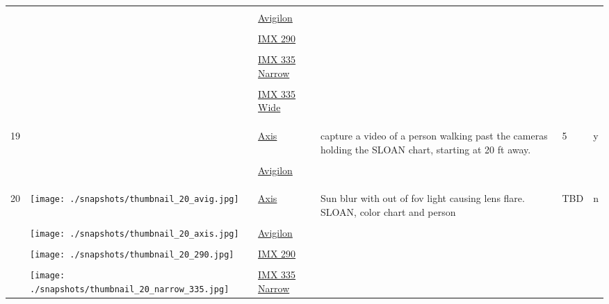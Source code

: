 \documentclass{article}%
\begin{document}
\begin{longtabu}{m{2.5cm} m{4cm} m{2cm} m{4cm} m{2cm} m{2cm}}
&&&&&\\%
&&\href{https://drive.google.com/file/d/1-qcgwIeB-aKKPN4876UKK7xUrmr5qoIq/view?usp=sharing}{Avigilon}&&&\\%
&&&&&\\%
&&\href{https://drive.google.com/file/d/1Iu1EfLJeHXa_JjDllOpr4-4cYTW-A6Qi/view?usp=sharing}{IMX 290}&&&\\%
&&&&&\\%
&&\href{https://drive.google.com/file/d/1vJurSPq0d2-cwRqFMI4j0Qtn5R3tj9Yf/view?usp=sharing}{IMX 335 Narrow}&&&\\%
&&&&&\\%
&&\href{https://drive.google.com/file/d/1WiUEC6ezI_au_0h3I4fXktTtXZvN71U1/view?usp=sharing}{IMX 335 Wide}&&&\\%
&&&&&\\%
&&&&&\\%
\hline%
&&&&&\\%
19&&\href{https://drive.google.com/file/d/1MypfVfnqdCmO7k3TIUOi_xsSDUAeejEr/view?usp=sharing}{Axis}&capture a video of a person walking past the cameras holding the SLOAN chart, starting at 20 ft away.&5&y\\%
&&&&&\\%
&&\href{https://drive.google.com/file/d/1Te8pv5D3VoVtNM7divX0yjCCQKAPuWkI/view?usp=sharing}{Avigilon}&&&\\%
&&&&&\\%
&&&&&\\%
\hline%
&&&&&\\%
20&\texttt{[image: ./snapshots/thumbnail\_20\_avig.jpg]}&\href{https://drive.google.com/file/d/1trMoN4_Qj6rcwCSOHmtkgjWLLSku7EkM/view?usp=sharing}{Axis}&Sun blur with out of fov light causing lens flare. SLOAN, color chart and person&TBD&n\\%
&&&&&\\%
&\texttt{[image: ./snapshots/thumbnail\_20\_axis.jpg]}&\href{https://drive.google.com/file/d/1vB1T6RgYJtf6zrmMJLaJG1hKovBnLq4O/view?usp=sharing}{Avigilon}&&&\\%
&&&&&\\%
&\texttt{[image: ./snapshots/thumbnail\_20\_290.jpg]}&\href{https://drive.google.com/file/d/1T-HAzKTL7PPchgBkOmDlhMyL-z_yinWA/view?usp=sharing}{IMX 290}&&&\\%
&&&&&\\%
&\texttt{[image: ./snapshots/thumbnail\_20\_narrow\_335.jpg]}&\href{https://drive.google.com/file/d/1uXhZv2HW6MxM04QiKPT79yJOb8IPqreU/view?usp=sharing}{IMX 335 Narrow}&&&\\%

\end{longtabu}
\end{document}
